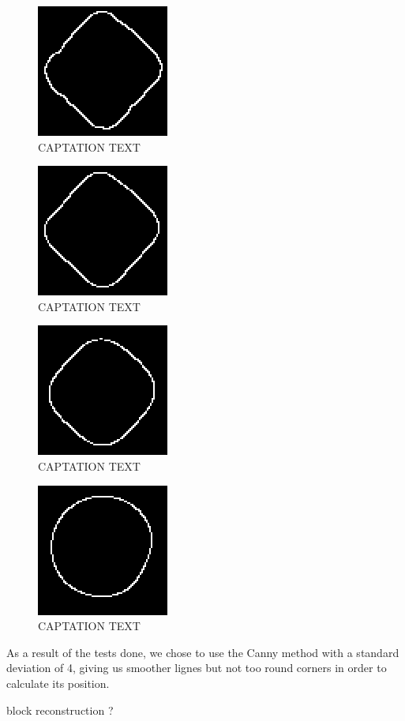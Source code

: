 	\begin{figure}[hb]
  \centering
  \includegraphics[scale=0.5]{figures/Canny_sqrt2.png}
  \caption[LABEL] {CAPTATION TEXT}
\end{figure}	
  	\begin{figure}[hb]
  \centering
  \includegraphics[scale=0.5]{figures/Canny_4.png}
  \caption[LABEL] {CAPTATION TEXT}
\end{figure}	
  	\begin{figure}[hb]
  \centering
  \includegraphics[scale=0.5]{figures/Canny_10.png}
  \caption[LABEL] {CAPTATION TEXT}
\end{figure}	
  	\begin{figure}[hb]
  \centering
  \includegraphics[scale=0.5]{figures/Canny_25.png}
  \caption[LABEL] {CAPTATION TEXT}
\end{figure}	
	

As a result of the tests done, we chose to use the Canny method with a standard deviation of 4, giving us smoother lignes but not too round corners in order to calculate its position.


\begin{flushleft}
 block reconstruction ?
 \end{flushleft}

 